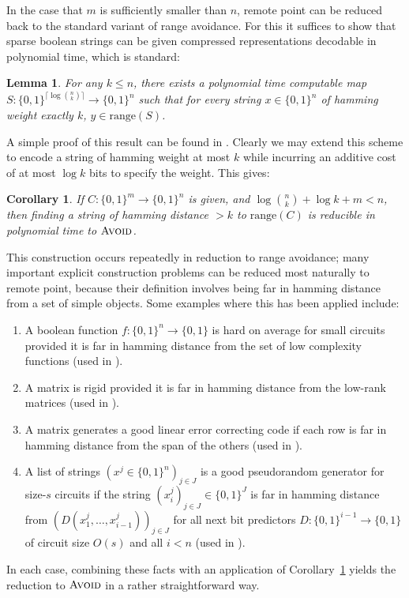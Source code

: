 \documentclass[11pt]{article}
\newtheorem{lemma}{Lemma}
\newtheorem{corollary}{Corollary}
\newcommand{\B}{\{0,1\}}
\newcommand{\avoid}{\textsc{Avoid}}
\begin{document}
In the case that $m$ is sufficiently smaller than $n$, remote point can be reduced back to the standard variant of range avoidance. For this it suffices to show that sparse boolean strings can be given compressed representations decodable in polynomial time, which is standard:
\begin{lemma}\label{lem:sparse}
For any $k \leq n$, there exists a polynomial time computable map ${S: \B^{\lceil \log \binom{n}{k}\rceil } \to \B^n}$ such that for every string $x \in \B^n$ of hamming weight exactly $k$, $y \in \mathrm{range}(S)$. 
\end{lemma}
A simple proof of this result can be found in \cite{Coin-Problem}. Clearly we may extend this scheme to encode a string of hamming weight at most $k$ while incurring an additive cost of at most $\log k$ bits to specify the weight. This gives:
\begin{corollary}\label{cor:remote-avoid}
If $C: \B^m \to \B^n$ is given, and $\log \binom{n}{k}+ \log k + m < n$, then finding a string of hamming distance $>k$ to $\mathrm{range}(C)$ is reducible in polynomial time to $\avoid$.
\end{corollary}

This construction occurs repeatedly in reduction to range avoidance; many important explicit construction problems can be reduced most naturally to remote point, because their definition involves being far in hamming distance from a set of simple objects. Some examples where this has been applied include:
\begin{enumerate}
   \item A boolean function $f: \B^n \to \B$ is hard on average for small circuits provided it is far in hamming distance from the set of low complexity functions (used in \cite{Korten1}).
	\item A matrix is rigid provided it is far in hamming distance from the low-rank matrices (used in \cite{Korten1}).
	\item A matrix generates a good linear error correcting code if each row is far in hamming distance from the span of the others (used in \cite{low-depth-avoid}).
	\item A list of strings $(x^j\in \B^n)_{j \in J}$ is a good pseudorandom generator for size-$s$ circuits if the string $(x^j_{i})_{j \in J} \in \B^J$ is far in hamming distance from $(D(x^{j}_1,\ldots,x^{j}_{i-1}))_{j \in J}$ for all next bit predictors $D: \B^{i-1} \to \B$ of circuit size $O(s)$ and all $i < n$ (used in \cite{Korten1}).
\end{enumerate} 
In each case, combining these facts with an application of Corollary~\ref{cor:remote-avoid} yields the reduction to $\avoid$ in a rather straightforward way.
\end{document}
